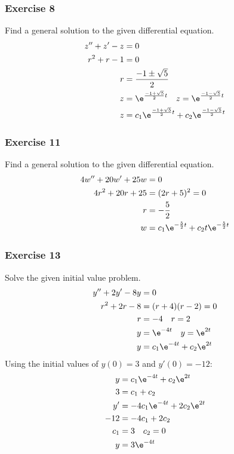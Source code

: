 \documentclass{math}
\begin{document}
\subsubsection*{Exercise 8}
Find a general solution to the given differential equation.
\begin{align*}
  z''+z'-z &= 0 \\
  r^2+r-1 &= 0 \\
  r &= \frac{-1\pm\sqrt{5}}{2} \\
  z &= \e^{\frac{-1+\sqrt{5}}{2}t} \quad z = \e^{\frac{-1-\sqrt{5}}{2}t} \\
  z &= c_1\e^{\frac{-1+\sqrt{5}}{2}t}+c_2\e^{\frac{-1-\sqrt{5}}{2}t}
\end{align*}

\subsubsection*{Exercise 11}
Find a general solution to the given differential equation.
\begin{align*}
  4w''+20w'+25w &= 0 \\
  4r^2+20r+25 &= (2r+5)^2 = 0 \\
  r &= -\frac{5}{2} \\
  w &= c_1\e^{-\frac{5}{2}t}+c_2t\e^{-\frac{5}{2}t}
\end{align*}

\subsubsection*{Exercise 13}
Solve the given initial value problem.
\begin{align*}
  y''+2y'-8y &= 0 \\
  r^2+2r-8 &= (r+4)(r-2) = 0 \\
  r &= -4 \quad r = 2 \\
  y &= \e^{-4t} \quad y = \e^{2t} \\
  y &= c_1\e^{-4t}+c_2\e^{2t}
\end{align*}
Using the initial values of \( y(0) = 3 \) and \( y'(0) = -12 \):
\begin{align*}
  y &= c_1\e^{-4t}+c_2\e^{2t} \\
  3 &= c_1+c_2 \\
  y' &= -4c_1\e^{-4t}+2c_2\e^{2t} \\
  -12 &= -4c_1+2c_2 \\
  c_1 &= 3 \quad c_2 = 0 \\
  y &= 3\e^{-4t}
\end{align*}
\end{document}

